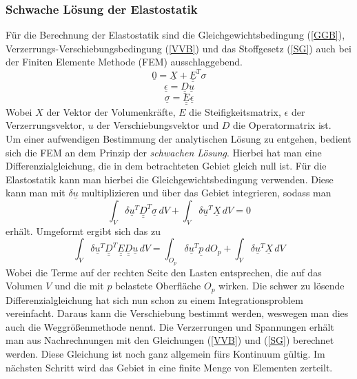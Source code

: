 \subsubsection{Schwache Lösung der Elastostatik}
Für die Berechnung der Elastostatik sind die Gleichgewichtsbedingung (\ref{GGB}),  Verzerrungs-Verschiebungsbedingung (\ref{VVB}) und das Stoffgesetz (\ref{SG}) auch bei der Finiten Elemente Methode (FEM) ausschlaggebend.
\begin{equation}\label{GGB}
	\underline{0} = \underline{X} + \underline{\underline{E}}^T \sigma 
\end{equation}
\begin{equation}\label{VVB}
	\underline{\epsilon} = \underline{\underline{D}} \underline{u}
\end{equation}
\begin{equation}\label{SG}
	\underline{\sigma} = \underline{\underline{E}} \underline{\epsilon}
\end{equation}
Wobei \underline{$X$} der Vektor der Volumenkräfte, \underline{\underline{$E$}} die Steifigkeitsmatrix, \underline{$\epsilon$} der Verzerrungsvektor, \underline{$u$} der Verschiebungsvektor und \underline{\underline{$D$}} die Operatormatrix ist.\\
Um einer aufwendigen Bestimmung der analytischen Lösung zu entgehen, bedient sich die FEM an dem Prinzip der \textit{schwachen Lösung}. Hierbei hat man eine Differenzialgleichung, die in dem betrachteten Gebiet gleich null ist. Für die Elastostatik kann man hierbei die Gleichgewichtsbedingung verwenden. Diese kann man mit $\delta\underline{u}$ multiplizieren und über das Gebiet integrieren, sodass man
\begin{equation}
	\int_{V}^{}\delta\underline{u}^T\underline{\underline{D}}^T\underline{\sigma}\,dV + \int_{V}^{}\delta\underline{u}^T\underline{X}\,dV = 0
\end{equation}
erhält. Umgeformt ergibt sich das zu
\begin{equation}\label{SL}
	\int_{V}^{}\delta\underline{u}^T\underline{\underline{D}}^T\underline{\underline{E}}\underline{\underline{D}}\underline{u}\,dV = \int_{O_{p}}^{}\delta\underline{u}^T\underline{p}\,dO_p + \int_{V}^{}\delta\underline{u}^T\underline{X}\,dV
\end{equation}
Wobei die Terme auf der rechten Seite den Lasten entsprechen, die auf das Volumen $V$ und die mit $p$ belastete Oberfläche $O_{p}$ wirken. Die schwer zu lösende Differenzialgleichung hat sich nun schon zu einem Integrationsproblem vereinfacht. Daraus kann die Verschiebung bestimmt werden, weswegen man dies auch die Weggrößenmethode nennt. Die Verzerrungen und Spannungen erhält man aus Nachrechnungen mit den Gleichungen (\ref{VVB}) und (\ref{SG}) berechnet werden. Diese Gleichung ist noch ganz allgemein fürs Kontinuum gültig. Im nächsten Schritt wird das Gebiet in eine finite Menge von Elementen zerteilt.
